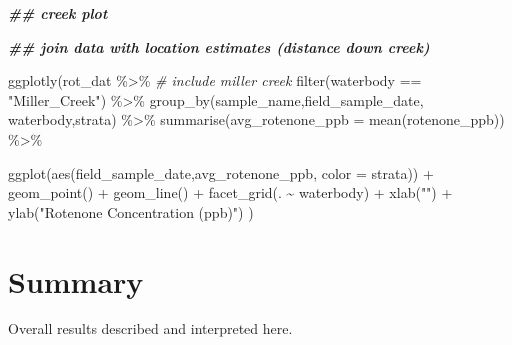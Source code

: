 \documentclass[
]{book}
\newenvironment{Shaded}{\begin{snugshade}}{\end{snugshade}}
\newcommand{\AttributeTok}[1]{\textcolor[rgb]{0.77,0.63,0.00}{#1}}
\newcommand{\CommentTok}[1]{\textcolor[rgb]{0.56,0.35,0.01}{\textit{#1}}}
\newcommand{\DocumentationTok}[1]{\textcolor[rgb]{0.56,0.35,0.01}{\textbf{\textit{#1}}}}
\newcommand{\FunctionTok}[1]{\textcolor[rgb]{0.00,0.00,0.00}{#1}}
\newcommand{\NormalTok}[1]{#1}
\newcommand{\SpecialCharTok}[1]{\textcolor[rgb]{0.00,0.00,0.00}{#1}}
\newcommand{\StringTok}[1]{\textcolor[rgb]{0.31,0.60,0.02}{#1}}
\begin{document}
\begin{Shaded}
\begin{Highlighting}[]
\DocumentationTok{\#\# creek plot}

\DocumentationTok{\#\# join data with location estimates (distance down creek)}


\FunctionTok{ggplotly}\NormalTok{(rot\_dat }\SpecialCharTok{\%\textgreater{}\%}
    \CommentTok{\# include miller creek}
      \FunctionTok{filter}\NormalTok{(waterbody }\SpecialCharTok{==} \StringTok{"Miller\_Creek"}\NormalTok{) }\SpecialCharTok{\%\textgreater{}\%}
    \FunctionTok{group\_by}\NormalTok{(sample\_name,field\_sample\_date, waterbody,strata) }\SpecialCharTok{\%\textgreater{}\%}
    \FunctionTok{summarise}\NormalTok{(}\AttributeTok{avg\_rotenone\_ppb =} \FunctionTok{mean}\NormalTok{(rotenone\_ppb)) }\SpecialCharTok{\%\textgreater{}\%}
  
    \FunctionTok{ggplot}\NormalTok{(}\FunctionTok{aes}\NormalTok{(field\_sample\_date,avg\_rotenone\_ppb, }\AttributeTok{color =}\NormalTok{ strata)) }\SpecialCharTok{+}
    \FunctionTok{geom\_point}\NormalTok{() }\SpecialCharTok{+}
    \FunctionTok{geom\_line}\NormalTok{() }\SpecialCharTok{+}
    \FunctionTok{facet\_grid}\NormalTok{(. }\SpecialCharTok{\textasciitilde{}}\NormalTok{ waterbody) }\SpecialCharTok{+}
      \FunctionTok{xlab}\NormalTok{(}\StringTok{""}\NormalTok{) }\SpecialCharTok{+}
      \FunctionTok{ylab}\NormalTok{(}\StringTok{"Rotenone Concentration (ppb)"}\NormalTok{)}
\NormalTok{  )}
\end{Highlighting}
\end{Shaded}

\hypertarget{summary-1}{%
\chapter{Summary}\label{summary-1}}

Overall results described and interpreted here.

  
\end{document}
